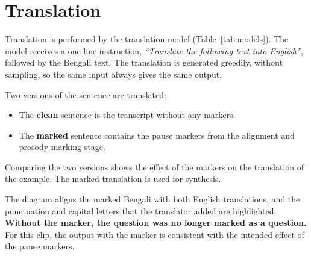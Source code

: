 \section{Translation}

Translation is performed by the translation model (Table~\ref{tab:models}). The model receives a one-line instruction, \emph{``Translate the following text into English''}, followed by the Bengali text. The translation is generated greedily, without sampling, so the same input always gives the same output.

Two versions of the sentence are translated:
\begin{itemize}[nosep]
  \item The \textbf{clean} sentence is the transcript without any markers.
  \item The \textbf{marked} sentence contains the pause markers from the alignment and prosody marking stage.
\end{itemize}
Comparing the two versions shows the effect of the markers on the translation of the example. The marked translation is used for synthesis.

\begin{example}[: translation]
The diagram aligns the marked Bengali with both English translations, and the punctuation and capital letters that the translator added are highlighted. \textbf{Without the marker, the question was no longer marked as a question.} For this clip, the output with the marker is consistent with the intended effect of the pause markers.

\begin{center}

\end{center}
\end{example}
